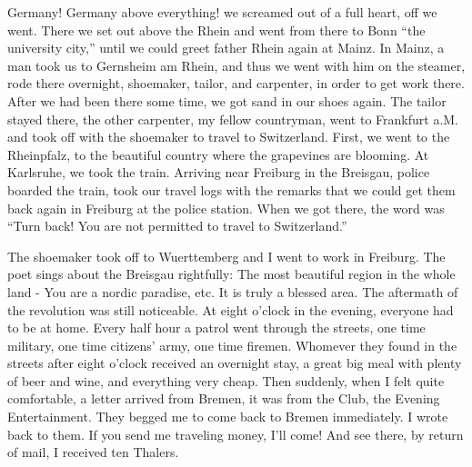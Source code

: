 Germany! Germany above everything! we screamed out of a full heart, off we went. There we set out above the Rhein and went from there to Bonn ``the university city,'' until we could greet father Rhein again at Mainz. In Mainz, a man took us to Gernsheim am Rhein, and thus we went with him on the steamer, rode there overnight, shoemaker, tailor, and carpenter, in order to get work there. After we had been there some time, we got sand in our shoes again. The tailor stayed there, the other carpenter, my fellow countryman, went to Frankfurt a.M. and took off with the shoemaker to travel to Switzerland. First, we went to the Rheinpfalz, to the beautiful country where the grapevines are blooming. At Karlsruhe, we took the train. Arriving near Freiburg in the Breisgau, police boarded the train, took our travel logs with the remarks that we could get them back again in Freiburg at the police station. When we got there, the word was ``Turn back! You are not permitted to travel to Switzerland.''

The shoemaker took off to Wuerttemberg and I went to work in Freiburg. The poet sings about the Breisgau rightfully: The most beautiful region in the whole land - You are a nordic paradise, etc. It is truly a blessed area. The aftermath of the revolution was still noticeable. At eight o'clock in the evening, everyone had to be at home. Every half hour a patrol went through the streets, one time military, one time citizens' army, one time firemen. Whomever they found in the streets after eight o'clock received an overnight stay, a great big meal with plenty of beer and wine, and everything very cheap. Then suddenly, when I felt quite comfortable, a letter arrived from Bremen, it was from the Club, the Evening Entertainment. They begged me to come back to Bremen immediately. I wrote back to them. If you send me traveling money, I'll come! And see there, by return of mail, I received ten Thalers.

